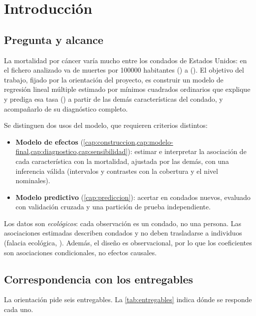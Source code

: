\chapter{Introducción}\label{cap:introduccion}

\section{Pregunta y alcance}

La mortalidad por cáncer varía mucho entre los condados de Estados Unidos: en el fichero
analizado va de  muertes por \num{100000} habitantes () a
 (). El objetivo del trabajo, fijado por la orientación del
proyecto, es construir un modelo de regresión lineal múltiple estimado por mínimos cuadrados
ordinarios que explique y prediga esa tasa () a partir de las demás
características del condado, y acompañarlo de su diagnóstico completo.

Se distinguen dos usos del modelo, que requieren criterios distintos:
\begin{itemize}
  \item \textbf{Modelo de efectos} (\cref{cap:construccion,cap:modelo-final,cap:diagnostico,cap:sensibilidad}):
  estimar e interpretar la asociación de cada característica con la mortalidad, ajustada por
  las demás, con una inferencia válida (intervalos y contrastes con la cobertura y el nivel
  nominales).
  \item \textbf{Modelo predictivo} (\cref{cap:prediccion}): acertar en condados nuevos,
  evaluado con validación cruzada y una partición de prueba independiente.
\end{itemize}

Los datos son \emph{ecológicos}: cada observación es un condado, no una persona. Las
asociaciones estimadas describen condados y no deben trasladarse a individuos (falacia
ecológica, \cite{robinson1950}). Además, el diseño es observacional, por lo que los
coeficientes son asociaciones condicionales, no efectos causales.

\section{Correspondencia con los entregables}

La orientación pide seis entregables. La \cref{tab:entregables} indica dónde se responde cada uno.

